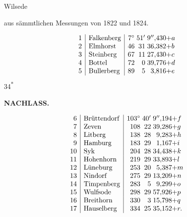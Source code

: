 \medskip
{\centering
[3.]\par\smallskip
Wilsede\par\smallskip
aus sämmtlichen Messungen von 1822 und 1824.\par\smallskip
[Annahme.]\par}
\[
\begin{array}{@{}r|l|r@{\;}r@{\;}r@{}l@{}}
 1&\text{Falkenberg}&7^\circ&51'&9''{,}430&+a\\
 2&\text{Elmhorst}&46&31&36{,}382&+b\\
 3&\text{Steinberg}&67&11&27{,}430&+c\\
 4&\text{Bottel}&72&0&39{,}776&+d\\
 5&\text{Bullerberg}&89&5&3{,}816&+e
\end{array}
\]
\noindent\hfill{\small 34\textsuperscript{*}}\hspace*{.12\linewidth}\par

\par\clearpage
\noindent{}\hfill{\small\textbf{NACHLASS.}}\hfill\null\par\medskip

\[
\begin{array}{@{}r|l|r@{\;}r@{\;}r@{}l@{}}
 6&\text{Brüttendorf}&103^\circ&40'&9''{,}194&+f\\
 7&\text{Zeven}&108&22&39{,}286&+g\\
 8&\text{Litberg}&138&28&9{,}283&+h\\
 9&\text{Hamburg}&183&29&1{,}167&+i\\
 10&\text{Syk}&204&28&34{,}438&+k\\
 11&\text{Hohenhorn}&219&29&33{,}893&+l\\
 12&\text{Lüneburg}&253&20&5{,}387&+m\\
 13&\text{Nindorf}&275&29&13{,}209&+n\\
 14&\text{Timpenberg}&283&5&9{,}299&+o\\
 15&\text{Wulfsode}&298&29&57{,}926&+p\\
 16&\text{Breithorn}&330&3&15{,}798&+q\\
 17&\text{Hauselberg}&334&25&35{,}152&+r.
\end{array}
\]

